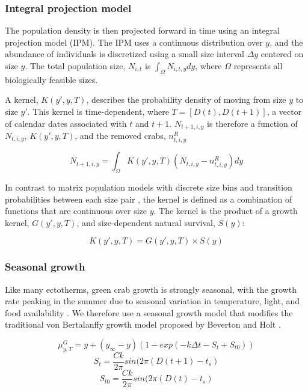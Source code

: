 \documentclass{article}
\begin{document}
\subsubsection*{Integral projection model}

The population density is then projected forward in time using an integral projection model (IPM). The IPM uses a continuous distribution over $y$, and the abundance of individuals is discretized using a small size interval $\Delta y$ centered on size $y$. The total population size, $N_{i,t}$ is $\int_{\Omega} N_{i,t,y} dy$, where $\Omega$ represents all biologically feasible sizes.

A kernel, $K(y', y, T)$, describes the probability density of moving from size $y$ to size $y'$. This kernel is time-dependent, where $T = [D(t), D(t+1)]$, a vector of calendar dates associated with $t$ and $t+1$. $N_{t+1,i,y}$ is therefore a function of $N_{t,i,y}$, $K(y', y, T)$, and the removed crabs, $n^R_{t,i,y}$

\begin{equation}
N_{t+1,i,y} = \int_{\Omega} K(y',y, T) (N_{t,i,y} - n^R_{t,i,y}) dy 
\end{equation}

In contrast to matrix population models with discrete size bins and transition probabilities between each size pair \parencite{caswell2001matrix}, the kernel is defined as a combination of functions that are continuous over size $y$. The kernel is the product of a growth kernel, $G(y',y, T)$, and size-dependent natural survival, $S(y)$:

\begin{equation}
K(y',y, T) = G(y',y, T) \times S(y)
\end{equation}

\subsubsection*{Seasonal growth}

Like many ectotherms, green crab growth is strongly seasonal, with the growth rate peaking in the summer due to seasonal variation in temperature, light, and food availability \parencite{contreras2003population, garcia2012technical}. We therefore use a seasonal growth model that modifies the traditional von Bertalanffy growth model proposed by Beverton and Holt \parencite{beverton2012dynamics, somers1988seasonally}.

\begin{equation}
\mu^G_{y,T} = y + (y_{\infty}-y)(1-exp(-k\Delta t-S_t+S_{t0}))
\end{equation}
\begin{equation}
S_t = \frac{Ck}{2\pi} sin(2\pi(D(t+1)-t_s)
\end{equation}
\begin{equation}
S_{t0} = \frac{Ck}{2\pi} sin(2\pi(D(t)-t_s)
\end{equation}
\end{document}
